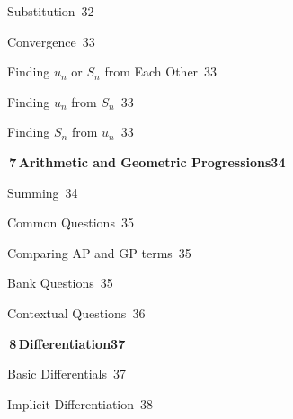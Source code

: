 \documentclass[a4paper,openany]{book}
\begin{document}
{\noindent{}\quad Substitution\dotfill\ 32\par
\noindent{}\quad Convergence\dotfill\ 33\par
\noindent{}\quad Finding $u_n$ or $S_n$ from Each Other\dotfill\ 33\par
\noindent{}\quad Finding $u_n$ from $S_n$\dotfill\ 33\par
\noindent{}\quad Finding $S_n$ from $u_n$\dotfill\ 33\par
\medskip\noindent\colorbox{blue!8}{\parbox{\dimexpr\textwidth-2\fboxsep}{\large\bfseries\color{blue!50!black}\colorbox{blue!50!black}{\color{white}\,7\,}\quad Arithmetic and Geometric Progressions\hfill 34}}\par\nopagebreak\smallskip\nopagebreak
\noindent{}\quad Summing\dotfill\ 34\par
\noindent{}\quad Common Questions\dotfill\ 35\par
\noindent{}\quad Comparing AP and GP terms\dotfill\ 35\par
\noindent{}\quad Bank Questions\dotfill\ 35\par
\noindent{}\quad Contextual Questions\dotfill\ 36\par
\medskip\noindent\colorbox{blue!8}{\parbox{\dimexpr\textwidth-2\fboxsep}{\large\bfseries\color{blue!50!black}\colorbox{blue!50!black}{\color{white}\,8\,}\quad Differentiation\hfill 37}}\par\nopagebreak\smallskip\nopagebreak
\noindent{}\quad Basic Differentials\dotfill\ 37\par
\noindent{}\quad Implicit Differentiation\dotfill\ 38\par
}
\end{document}
